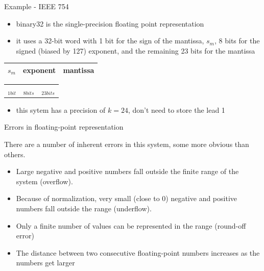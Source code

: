 \documentclass[12pt]{beamer}
\begin{document}
\begin{frame}{Example - IEEE 754}
\begin{itemize}
\item{binary32 is the single-precision floating point representation}
\item{it uses a 32-bit word with 1 bit for the sign of the mantissa, $s_m$, 8 bits for the signed (biased by 127) exponent, and the remaining 23 bits for the mantissa}
\end{itemize}

\begin{center}
\begin{tabular}{ |c|c|c| } 
 \hline
 $s_m$ & exponent & \hspace{0.65 in} mantissa \hspace{0.65 in} \\ 
 \hline
\end{tabular}
\begin{tabular}{ ccc } 
 $_{1 bit}$ & \hspace{0.15 in} $_{8 bits}$ \hspace{0.28 in} & \hspace{0.65 in} $_{23 bits}$ \hspace{0.65 in} \\ 
\end{tabular}
\end{center}
\vspace{1 in}
\begin{itemize}
\item{this sytem has a precision of $k=24$, don't need to store the lead 1}
\end{itemize}
\end{frame}

\begin{frame}{Errors in floating-point representation}

There are a number of inherent errors in this system, some more obvious than others.

\begin{itemize}
\item{Large negative and positive numbers fall outside the finite range of the system (overflow).} 
\item{Because of normalization, very small  (close to 0) negative and positive numbers fall outside the range (underflow).} 
\item{Only a finite number of values can be represented in the range (round-off error)} 
\item{The distance between two consecutive floating-point numbers increases as the numbers get larger}
\end{itemize}
\end{frame} 
\end{document}
